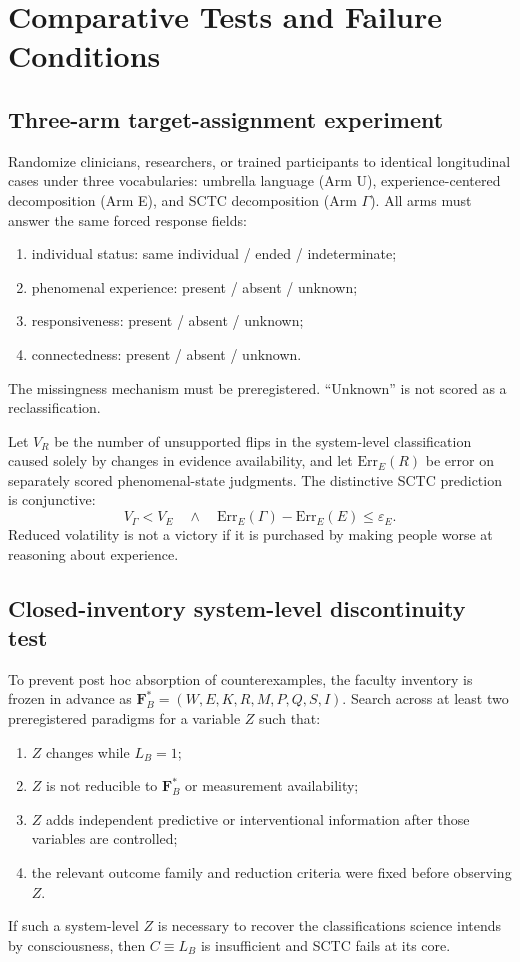 \section{Comparative Tests and Failure Conditions}
\subsection{Three-arm target-assignment experiment}
Randomize clinicians, researchers, or trained participants to identical longitudinal cases under three vocabularies: umbrella language (Arm U), experience-centered decomposition (Arm E), and SCTC decomposition (Arm $\Gamma$). All arms must answer the same forced response fields:
\begin{enumerate}
\item individual status: same individual / ended / indeterminate;
\item phenomenal experience: present / absent / unknown;
\item responsiveness: present / absent / unknown;
\item connectedness: present / absent / unknown.
\end{enumerate}
The missingness mechanism must be preregistered. ``Unknown'' is not scored as a reclassification.

Let $V_R$ be the number of unsupported flips in the system-level classification caused solely by changes in evidence availability, and let $\mathrm{Err}_E(R)$ be error on separately scored phenomenal-state judgments. The distinctive SCTC prediction is conjunctive:
\begin{equation}
\boxed{V_\Gamma<V_E\quad\land\quad \mathrm{Err}_E(\Gamma)-\mathrm{Err}_E(E)\le\varepsilon_E.}
\end{equation}
Reduced volatility is not a victory if it is purchased by making people worse at reasoning about experience.

\subsection{Closed-inventory system-level discontinuity test}
To prevent post hoc absorption of counterexamples, the faculty inventory is frozen in advance as $\mathbf F_B^*=(W,E,K,R,M,P,Q,S,I)$. Search across at least two preregistered paradigms for a variable $Z$ such that:
\begin{enumerate}
\item $Z$ changes while $L_B=1$;
\item $Z$ is not reducible to $\mathbf F_B^*$ or measurement availability;
\item $Z$ adds independent predictive or interventional information after those variables are controlled;
\item the relevant outcome family and reduction criteria were fixed before observing $Z$.
\end{enumerate}
If such a system-level $Z$ is necessary to recover the classifications science intends by consciousness, then $C\equiv L_B$ is insufficient and SCTC fails at its core.

